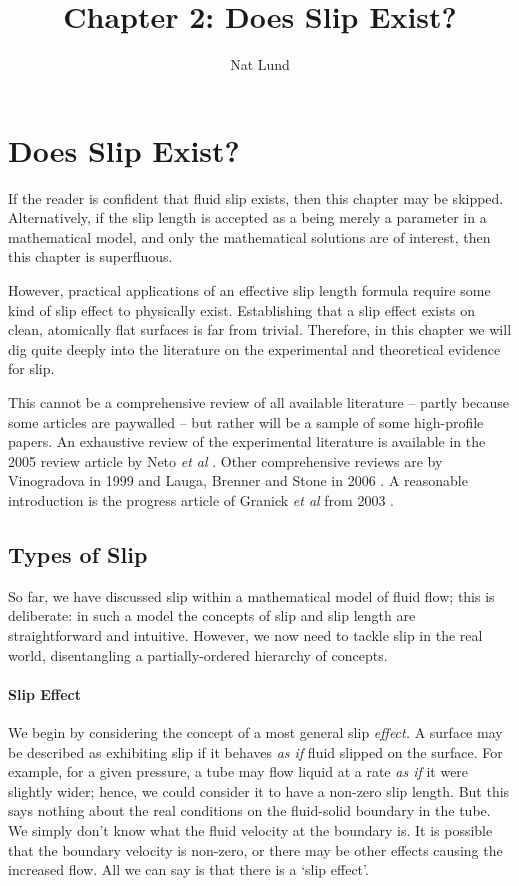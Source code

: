 \documentclass[12pt, a4paper, twoside, openright]{book}
\author{Nat Lund}
\title{Chapter 2: Does Slip Exist?}
\begin{document}
\chapter{Does Slip Exist?}

If the reader is confident that fluid slip exists, then this chapter may be skipped.  Alternatively, if the slip length is accepted as a being merely a parameter in a mathematical model, and only the mathematical solutions are of interest, then this chapter is superfluous.

However, practical applications of an effective slip length formula require some kind of slip effect to physically exist.  Establishing that a slip effect exists on clean, atomically flat surfaces is far from trivial.  Therefore, in this chapter we will dig quite deeply into the literature on the experimental and theoretical evidence for slip.

This cannot be a comprehensive review of all available literature -- partly because some articles are paywalled -- but rather will be a sample of some high-profile papers.
An exhaustive review of the experimental literature is available in the 2005 review article by Neto \emph{et al} \cite{NetoReview2005}. Other comprehensive reviews are by Vinogradova in 1999 \cite{VinogradovaReview1999} and Lauga, Brenner and Stone in 2006 \cite{LaugaReview2006}. A reasonable introduction is the progress article of Granick \emph{et al} from 2003 \cite{GranickReview2003}.

\section*{Types of Slip}

So far, we have discussed slip within a mathematical model of fluid flow; this is deliberate: in such a model the concepts of slip and slip length are straightforward and intuitive. However, we now need to tackle slip in the real world, disentangling a partially-ordered hierarchy of concepts.

\subsubsection*{Slip Effect}

We begin by considering the concept of a most general slip \emph{effect.} A surface may be described as exhibiting slip if it behaves \emph{as if} fluid slipped on the surface.  For example, for a given pressure, a tube may flow liquid at a rate \emph{as if} it were slightly wider; hence, we could consider it to have a non-zero slip length. But this says nothing about the real conditions on the fluid-solid boundary in the tube. We simply don't know what the fluid velocity at the boundary is. It is possible that the boundary velocity is non-zero, or there may be other effects causing the increased flow. All we can say is that there is a `slip effect'.
\end{document}
